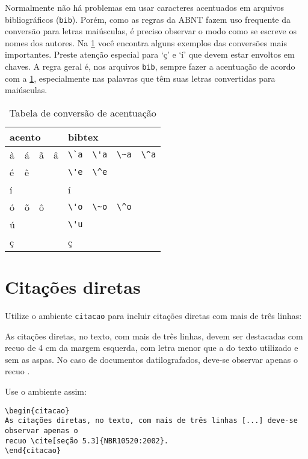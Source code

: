 Normalmente não há problemas em usar caracteres acentuados em arquivos bibliográficos (\texttt{bib}). Porém, como as regras da ABNT fazem uso frequente da conversão para letras maiúsculas, é preciso observar o modo como se escreve os nomes dos autores. Na \cref{tab:acentos} você encontra alguns exemplos das conversões mais importantes. Preste atenção especial para `ç' e `í' que devem estar envoltos em chaves. A regra geral é, nos arquivos \texttt{bib}, sempre fazer a acentuação de acordo com a \cref{tab:acentos}, especialmente nas palavras que têm suas letras convertidas para maiúsculas.

\begin{table}[htb]
\centering
\caption{Tabela de conversão de acentuação}
\label{tab:acentos}
\begin{tabular}{llllllll} \toprule
\multicolumn{4}{l}{acento} & \multicolumn{4}{l}{bibtex} \\ \midrule
\`a & \'a & \~a & \^a & \verb|\`a| & \verb|\'a| & \verb|\~a| & \verb|\^a| \\
\'e & \^e & & & \verb|\'e| & \verb|\^e| & & \\
í & & & & \multicolumn{2}{l}{\Verb{{\'i}}} & & \\
\'o & \~o & \^o & & \verb|\'o| & \verb|\~o| & \verb|\^o| & \\
\'u & & & & \verb|\'u| & & & \\
{\c c} & & & & \multicolumn{2}{l}{\Verb{{\c c}}} & & \\ \bottomrule
\end{tabular}
\end{table}

\section{Citações diretas}\label{sec:citacao}

Utilize o ambiente \texttt{citacao} para incluir citações diretas com mais de três linhas:
\begin{citacao}
As citações diretas, no texto, com mais de três linhas, devem ser destacadas com recuo de 4 cm da margem esquerda, com letra menor que a do texto utilizado e sem as aspas. No caso de documentos datilografados, deve-se observar apenas o recuo \cite[seção 5.3]{NBR10520:2002}.
\end{citacao}

Use o ambiente assim:
\begin{verbatim}
\begin{citacao}
As citações diretas, no texto, com mais de três linhas [...] deve-se observar apenas o
recuo \cite[seção 5.3]{NBR10520:2002}.
\end{citacao}
\end{verbatim}


